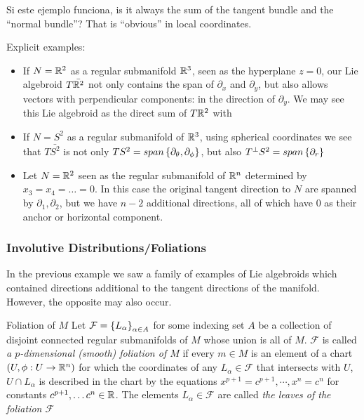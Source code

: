 Si este ejemplo funciona, is it always the sum of the tangent bundle and the ``normal bundle''? That is ``obvious'' in local coordinates.




Explicit examples:
\begin{itemize}
\item If $N = \mathbb{R}^2$ as a regular submanifold $\mathbb{R}^3$, seen as the hyperplane $z = 0$, our Lie algebroid $T \bar {\mathbb{R}^2}$ not only contains the span of $\partial_x$ and $\partial_y$, but also allows vectors with perpendicular components: in the direction of $\partial_y$. We may see this Lie algebroid as the direct sum of $T \mathbb{R}^2$ with 
\item If $N = S^2$ as a regular submanifold of $\mathbb{R}^3$, using spherical coordinates we see that $T \bar {S^2}$ is not only $TS^2 = span\set{\partial_\theta, \partial_\phi}$, but also $T^\perp S^2 = span\left\{ \partial_r \right\}$ 
\item Let $N = \mathbb{R}^2$ seen as the regular submanifold of $\mathbb{R}^n$ determined by $x_3 = x_4 = \dots = 0$. In this case the original tangent direction to $N$ are spanned by $\partial_1, \partial_2$, but we have $n-2$ additional directions, all of which have $0$ as their anchor or horizontal component.
\end{itemize}

\subsubsection{Involutive Distributions/Foliations}

In the previous example we saw a family of examples of Lie algebroids which contained directions additional to the tangent directions of the manifold. However, the opposite may also occur.

\begin{definition} {Foliation of $M$}
Let $\mathcal F = \left\{ L_\alpha \right\}_{\alpha \in A}$ for some indexing set $A$ be a collection of disjoint connected regular submanifolds of $M$ whose union is all of $M$. $\mathcal F$ is called \emph{a $p$-dimensional (smooth) foliation of $M$} if every $m \in M$ is an element of a chart  $(U, \phi:U \to \RR^n)$ for which the coordinates of any $L_\alpha \in \mathcal F$ that intersects with $U$, $U \cap L_\alpha$ is described in the chart by the equations $x^{p+1} = c^{p+1}, \cdots , x^{n} = c^{n} $ for constants $c^{p+1}, \dots c^n \in \mathbb{R}$. The elements $L_\alpha \in \mathcal F$ are called \emph{the leaves of the foliation $\mathcal F$}
\end{definition}

